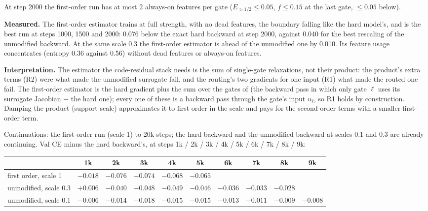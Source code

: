 \documentclass[11pt,a4paper]{article}
\begin{document}
At step 2000 the first-order run has at most 2 always-on features per gate (\(E_{>1/2}\le0.05\), \(f\le0.15\) at the
last gate, \(\le0.05\) below).

\textbf{Measured.}  The first-order estimator trains at full strength, with no dead features, the boundary falling
like the hard model's, and is the best run at steps 1000, 1500 and 2000: 0.076 below the exact hard backward at step
2000, against 0.040 for the best rescaling of the unmodified backward.  At the same scale 0.3 the first-order
estimator is ahead of the unmodified one by 0.010.  Its feature usage concentrates (entropy 0.36 against 0.56) without
dead features or always-on features.

\textbf{Interpretation.}  The estimator the code-residual stack needs is the sum of single-gate relaxations, not
their product: the product's extra terms (R2) were what made the unmodified surrogate fail, and the routing's
two gradients for one input (R1) what made the routed one fail.  The first-order estimator is the hard gradient plus the sum over the gates of
(the backward pass in which only gate \(\ell\) uses its surrogate Jacobian \(-\) the hard one); every one of these is a
backward pass through the gate's input \(u_\ell\), so R1 holds by construction.  Damping the product (support scale) approximates it to first order in the
scale and pays for the second-order terms with a smaller first-order term.

Continuations: the first-order run (scale 1) to 20k steps; the hard backward and the unmodified backward at scales
0.1 and 0.3 are already continuing.  Val CE minus the hard backward's, at steps 1k / 2k / 3k / 4k / 5k / 6k / 7k / 8k / 9k:

\begin{center}\small
\begin{tabular}{lccccccccc}
\toprule
 & 1k & 2k & 3k & 4k & 5k & 6k & 7k & 8k & 9k \\
\midrule
first order, scale 1   & \(-0.018\) & \(-0.076\) & \(-0.074\) & \(-0.068\) & \(-0.065\) & & & & \\
unmodified, scale 0.3  & \(+0.006\) & \(-0.040\) & \(-0.048\) & \(-0.049\) & \(-0.046\) & \(-0.036\) & \(-0.033\) & \(-0.028\) & \\
unmodified, scale 0.1  & \(-0.006\) & \(-0.014\) & \(-0.018\) & \(-0.015\) & \(-0.015\) & \(-0.013\) & \(-0.011\) & \(-0.009\) & \(-0.008\) \\
\bottomrule
\end{tabular}
\end{center}
\end{document}
